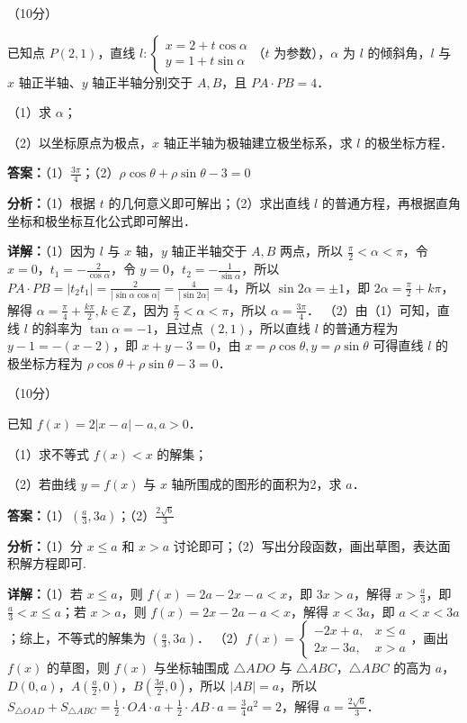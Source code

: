 \begin{question}[points=10]
[选修4-4：坐标系与参数方程]（10分）

已知点 $P(2,1)$，直线 $l: \begin{cases}x=2+t\cos\alpha\\ y=1+t\sin\alpha\end{cases}$（$t$ 为参数），$\alpha$ 为 $l$ 的倾斜角，$l$ 与 $x$ 轴正半轴、$y$ 轴正半轴分别交于 $A,B$，且 $PA\cdot PB=4$．

（1）求 $\alpha$；

（2）以坐标原点为极点，$x$ 轴正半轴为极轴建立极坐标系，求 $l$ 的极坐标方程．
\begin{solution}
\textbf{答案：}（1）$\frac{3\pi}{4}$；（2）$\rho\cos\theta+\rho\sin\theta-3=0$

\textbf{分析：}（1）根据 $t$ 的几何意义即可解出；（2）求出直线 $l$ 的普通方程，再根据直角坐标和极坐标互化公式即可解出．

\textbf{详解：}（1）因为 $l$ 与 $x$ 轴，$y$ 轴正半轴交于 $A,B$ 两点，所以 $\frac{\pi}{2}<\alpha<\pi$，令 $x=0$，$t_1=-\frac{2}{\cos\alpha}$，令 $y=0$，$t_2=-\frac{1}{\sin\alpha}$，所以 $PA\cdot PB=|t_2t_1|=\frac{2}{|\sin\alpha\cos\alpha|}=\frac{4}{|\sin2\alpha|}=4$，所以 $\sin2\alpha=\pm1$，即 $2\alpha=\frac{\pi}{2}+k\pi$，解得 $\alpha=\frac{\pi}{4}+\frac{k\pi}{2},k\in\mathbb{Z}$，因为 $\frac{\pi}{2}<\alpha<\pi$，所以 $\alpha=\frac{3\pi}{4}$．
（2）由（1）可知，直线 $l$ 的斜率为 $\tan\alpha=-1$，且过点 $(2,1)$，所以直线 $l$ 的普通方程为 $y-1=-(x-2)$，即 $x+y-3=0$，由 $x=\rho\cos\theta, y=\rho\sin\theta$ 可得直线 $l$ 的极坐标方程为 $\rho\cos\theta+\rho\sin\theta-3=0$．
\end{solution}
\end{question}

\begin{question}[points=10]
[选修4-5：不等式选讲]（10分）

已知 $f(x)=2|x-a|-a, a>0$．

（1）求不等式 $f(x)<x$ 的解集；

（2）若曲线 $y=f(x)$ 与 $x$ 轴所围成的图形的面积为2，求 $a$．
\begin{solution}
\textbf{答案：}（1）$(\frac{a}{3},3a)$；（2）$\frac{2\sqrt{6}}{3}$

\textbf{分析：}（1）分 $x\le a$ 和 $x>a$ 讨论即可；（2）写出分段函数，画出草图，表达面积解方程即可.

\textbf{详解：}（1）若 $x\le a$，则 $f(x)=2a-2x-a<x$，即 $3x>a$，解得 $x>\frac{a}{3}$，即 $\frac{a}{3}<x\le a$；若 $x>a$，则 $f(x)=2x-2a-a<x$，解得 $x<3a$，即 $a<x<3a$；综上，不等式的解集为 $(\frac{a}{3},3a)$．
（2）$f(x)=\begin{cases}-2x+a, & x\le a\\ 2x-3a, & x>a\end{cases}$，画出 $f(x)$ 的草图，则 $f(x)$ 与坐标轴围成 $\triangle ADO$ 与 $\triangle ABC$，$\triangle ABC$ 的高为 $a$，$D(0,a)$，$A(\frac{a}{2},0)$，$B(\frac{3a}{2},0)$，所以 $|AB|=a$，所以 $S_{\triangle OAD}+S_{\triangle ABC}=\frac{1}{2}\cdot OA\cdot a+\frac{1}{2}\cdot AB\cdot a=\frac{3}{4}a^2=2$，解得 $a=\frac{2\sqrt{6}}{3}$．
\end{solution}
\end{question}

